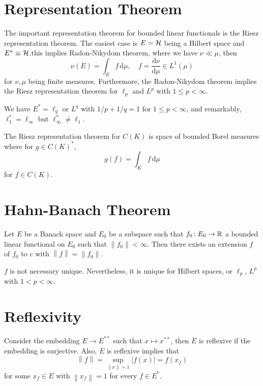\section{Representation Theorem}
The important representation theorem for bounded linear functionals is the Riesz representation theorem. The easiest case is \(E = \mathcal{\MakeUppercase{h}} \) being a Hilbert space and \(E^{\ast} \equiv \mathcal{\MakeUppercase{h}} \).this implies Radon-Nikydom theorem, where we have \(\nu \ll \mu \), then
\[
	\nu (E) = \int _E f\,\mathrm{d} \mu ,\quad f = \frac{\mathrm{d}\nu }{\mathrm{d}\mu } \in L^1(\mu )
\]
for \(\nu , \mu \) being finite measures. Furthermore, the Radon-Nikydom theorem implies the Riesz representation theorem for \(\ell _p\) and \(L^p\) with \(1 \leq p < \infty \).

\begin{remark}
	We have \(E^{\ast} = \ell _q\) or \(L^q\) with \(1 / p + 1 / q = 1\) for \(1 \leq p < \infty \), and remarkably, \(\ell _1^{\ast} = \ell _\infty \) but \(\ell _\infty ^{\ast} \neq \ell _1\).
\end{remark}

\begin{remark}
	The Riesz representation theorem for \(C(K)\) is space of bounded Borel measures where for \(g\in C(K)^{\ast} \),
	\[
		g(f) = \int _K f\,\mathrm{d} \mu
	\]
	for \(f\in C(K)\).
\end{remark}

\section{Hahn-Banach Theorem}
Let \(E\) be a Banach space and \(E_0\) be a subspace such that \(f_0 \colon E_0 \to \mathbb{\MakeUppercase{r}} \) a bounded linear functional on \(E_0\) such that \(\left\lVert f_0\right\rVert < \infty \). Then there exists an extension \(f\) of \(f_0\) to \(e\) with \(\left\lVert f\right\rVert = \left\lVert f_0\right\rVert \).

\begin{remark}
	\(f\) is not necessary unique. Nevertheless, it is unique for Hilbert spaces, or \(\ell _p\), \(L^p\) with \(1 < p < \infty \).
\end{remark}

\section{Reflexivity}
Consider the embedding \(E\to E^{\ast\ast} \) such that \(x\mapsto x^{\ast\ast}\), then \(E\) is reflexive if the embedding is surjective. Also, \(E\) is reflexive implies that
\[
	\left\lVert f\right\rVert = \sup _{\left\lVert x\right\rVert = 1}\left\vert f(x) \right\vert = f(x_f)
\]
for some \(x_f\in E\) with \(\left\lVert x_f\right\rVert = 1\) for every \(f\in E^{\ast} \).

